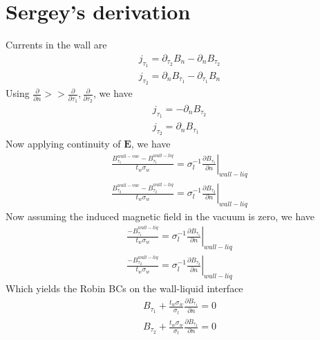 \documentclass[11pt]{article}
\newcommand{\PD}{\partial}
\newcommand{\E}{\mathbf{E}}
\begin{document}
\section{Sergey's derivation}
Currents in the wall are
\begin{equation} \begin{aligned}
  j_{\tau_1} = \PD_{\tau_2} B_n - \PD_n B_{\tau_2} \\
  j_{\tau_2} = \PD_n B_{\tau_1} - \PD_{\tau_1} B_n
\end{aligned} \end{equation}
Using $\frac{\PD}{\PD n} >> \frac{\PD}{\PD \tau_1},\frac{\PD}{\PD \tau_2}$, we have
\begin{equation} \begin{aligned}
  j_{\tau_1} =-\PD_n B_{\tau_2} \\
  j_{\tau_2} = \PD_n B_{\tau_1}
\end{aligned} \end{equation}
Now applying continuity of $\E$, we have
\begin{equation} \begin{aligned}
  \frac{B_{\tau_1}^{wall-vac}-B_{\tau_1}^{wall-liq}}{t_w \sigma_w}=\left. \sigma_l^{-1}\frac{\PD B_{\tau_1}}{\PD n} \right|_{wall-liq} \\
  \frac{B_{\tau_2}^{wall-vac}-B_{\tau_2}^{wall-liq}}{t_w \sigma_w}=\left. \sigma_l^{-1}\frac{\PD B_{\tau_2}}{\PD n} \right|_{wall-liq}
\end{aligned} \end{equation}
Now assuming the induced magnetic field in the vacuum is zero, we have
\begin{equation} \begin{aligned}
  \frac{-B_{\tau_1}^{wall-liq}}{t_w \sigma_w}= \left. \sigma_l^{-1}\frac{\PD B_{\tau_1}}{\PD n} \right|_{wall-liq} \\
  \frac{-B_{\tau_2}^{wall-liq}}{t_w \sigma_w}= \left. \sigma_l^{-1}\frac{\PD B_{\tau_2}}{\PD n} \right|_{wall-liq}
\end{aligned} \end{equation}
Which yields the Robin BCs on the wall-liquid interface
\begin{equation}
\boxed{
\begin{aligned}
  B_{\tau_1} + \frac{t_w \sigma_w}{\sigma_l} \frac{\PD B_{\tau_1} }{\PD n} = 0 \\
  B_{\tau_2} + \frac{t_w \sigma_w}{\sigma_l} \frac{\PD B_{\tau_2} }{\PD n} = 0
\end{aligned}
}
\end{equation}
\end{document}
